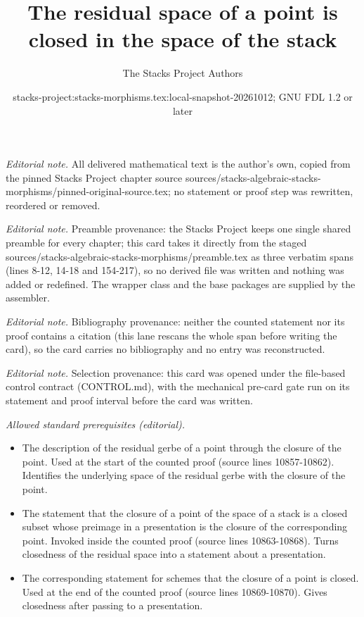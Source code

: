 \documentclass[10pt,a4paper]{amsart}
\title{The residual space of a point is closed in the space of the stack}
\author{The Stacks Project Authors}
\date{stacks-project:stacks-morphisms.tex:local-snapshot-20261012; GNU FDL 1.2 or later}
\theoremstyle{plain}
\theoremstyle{definition}
\theoremstyle{remark}
\numberwithin{equation}{subsection}
\begin{document}
\maketitle
\noindent\textit{Editorial note.} All delivered mathematical text is the author's own, copied from the pinned Stacks Project chapter source sources/stacks-algebraic-stacks-morphisms/pinned-original-source.tex; no statement or proof step was rewritten, reordered or removed.\par\medskip
\noindent\textit{Editorial note.} Preamble provenance: the Stacks Project keeps one single shared preamble for every chapter; this card takes it directly from the staged sources/stacks-algebraic-stacks-morphisms/preamble.tex as three verbatim spans (lines 8-12, 14-18 and 154-217), so no derived file was written and nothing was added or redefined. The wrapper class and the base packages are supplied by the assembler.\par\medskip
\noindent\textit{Editorial note.} Bibliography provenance: neither the counted statement nor its proof contains a citation (this lane rescans the whole span before writing the card), so the card carries no bibliography and no entry was reconstructed.\par\medskip
\noindent\textit{Editorial note.} Selection provenance: this card was opened under the file-based control contract (CONTROL.md), with the mechanical pre-card gate run on its statement and proof interval before the card was written.\par\medskip
\noindent\textit{Allowed standard prerequisites (editorial).}\begin{itemize}
\item The description of the residual gerbe of a point through the closure of the point. Used at the start of the counted proof (source lines 10857-10862). Identifies the underlying space of the residual gerbe with the closure of the point.
\item The statement that the closure of a point of the space of a stack is a closed subset whose preimage in a presentation is the closure of the corresponding point. Invoked inside the counted proof (source lines 10863-10868). Turns closedness of the residual space into a statement about a presentation.
\item The corresponding statement for schemes that the closure of a point is closed. Used at the end of the counted proof (source lines 10869-10870). Gives closedness after passing to a presentation.
\end{itemize}\medskip
\end{document}
